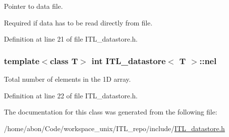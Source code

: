 Pointer to data file. 

Required if data has to be read directly from file. 

Definition at line 21 of file ITL\_\-datastore.h.

\hypertarget{classITL__datastore_aceb858e3255e686bc8567e4f203adc88}{
\subsubsection[{nel}]{\setlength{\rightskip}{0pt plus 5cm}template$<$class T$>$ int {\bf ITL\_\-datastore}$<$ T $>$::{\bf nel}}}
\label{classITL__datastore_aceb858e3255e686bc8567e4f203adc88}


Total number of elements in the 1D array. 



Definition at line 22 of file ITL\_\-datastore.h.



The documentation for this class was generated from the following file:\begin{DoxyCompactItemize}
\item 
/home/abon/Code/workspace\_\-unix/ITL\_\-repo/include/\hyperlink{ITL__datastore_8h}{ITL\_\-datastore.h}\end{DoxyCompactItemize}
